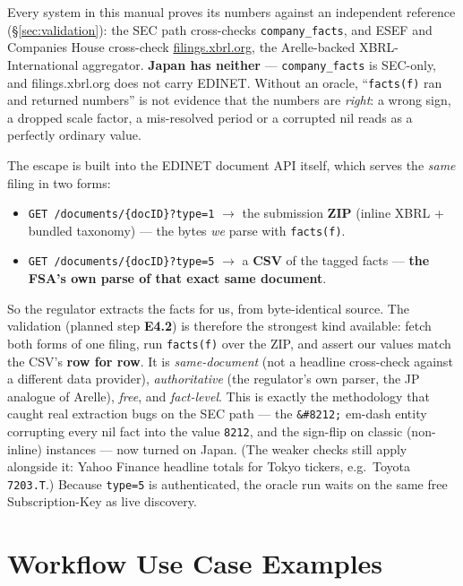 \documentclass[11pt,a4paper]{report}
\begin{document}
Every system in this manual proves its numbers against an independent reference (\S\ref{sec:validation}):
the SEC path cross-checks \texttt{company\_facts}, and ESEF and Companies House cross-check
\href{https://filings.xbrl.org}{filings.xbrl.org}, the Arelle-backed XBRL-International aggregator.
\textbf{Japan has neither} --- \texttt{company\_facts} is SEC-only, and filings.xbrl.org does not carry
EDINET. Without an oracle, ``\texttt{facts(f)} ran and returned numbers'' is not evidence that the numbers
are \emph{right}: a wrong sign, a dropped scale factor, a mis-resolved period or a corrupted nil reads as
a perfectly ordinary value.

The escape is built into the EDINET document API itself, which serves the \emph{same} filing in two forms:

\begin{itemize}[nosep]
  \item \texttt{GET /documents/\{docID\}?type=1} \(\rightarrow\) the submission \textbf{ZIP} (inline XBRL +
    bundled taxonomy) --- the bytes \emph{we} parse with \texttt{facts(f)}.
  \item \texttt{GET /documents/\{docID\}?type=5} \(\rightarrow\) a \textbf{CSV} of the tagged facts ---
    \textbf{the FSA's own parse of that exact same document}.
\end{itemize}

\noindent So the regulator extracts the facts for us, from byte-identical source. The validation
(planned step \textbf{E4.2}) is therefore the strongest kind available: fetch both forms of one filing,
run \texttt{facts(f)} over the ZIP, and assert our values match the CSV's \textbf{row for row}. It is
\emph{same-document} (not a headline cross-check against a different data provider),
\emph{authoritative} (the regulator's own parser, the JP analogue of Arelle), \emph{free}, and
\emph{fact-level}. This is exactly the methodology that caught real extraction bugs on the SEC path ---
the \texttt{\&\#8212;} em-dash entity corrupting every nil fact into the value \texttt{8212}, and the
sign-flip on classic (non-inline) instances --- now turned on Japan. (The weaker checks still apply
alongside it: Yahoo Finance headline totals for Tokyo tickers, e.g.\ Toyota \texttt{7203.T}.) Because
\texttt{type=5} is authenticated, the oracle run waits on the same free Subscription-Key as live
discovery.

\section{Workflow Use Case Examples}\label{sec:edinet-workflows}
\end{document}
